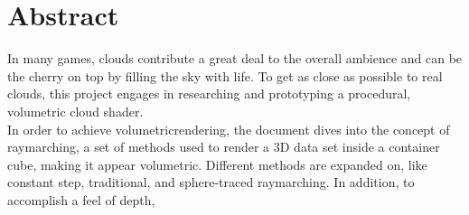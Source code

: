 \section*{Abstract}
In many games, clouds contribute a great deal to the overall ambience and can be the cherry on top by filling the sky with life.
To get as close as possible to real clouds, this project engages in researching and prototyping a \gls{procedural}, volumetric cloud shader.
\\
In order to achieve \gls{volumetricrendering}, the document dives into the concept of \gls{raymarching}, a set of methods used to render a 3D data set inside a container cube, making it appear volumetric.
Different methods are expanded on, like constant step, traditional, and sphere-traced \gls{raymarching}. In addition, to accomplish a feel of depth, 
